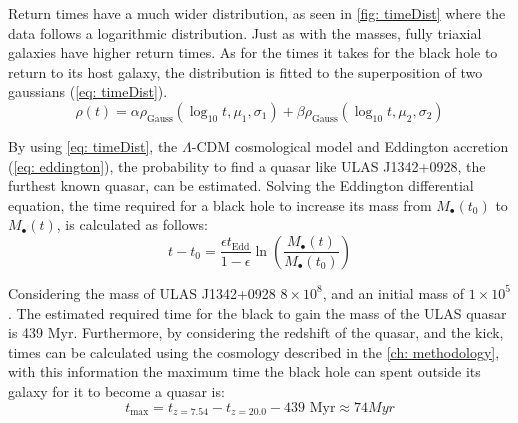 	Return times have a much wider distribution, as seen in \autoref{fig: timeDist} where the data follows a logarithmic distribution. Just as with the masses, fully triaxial galaxies have higher return times. As for the times it takes for the black hole to return to its host galaxy, the distribution is fitted to the superposition of two gaussians (\autoref{eq: timeDist}).
	\begin{equation}\label{eq: timeDist}
		\rho(t) = \alpha\rho_\text{Gauss}(\log_{10}t, \mu_1, \sigma_1) + \beta\rho_\text{Gauss}(\log_{10}t, \mu_2, \sigma_2)
	\end{equation}
	
	By using \autoref{eq: timeDist}, the $\Lambda$-CDM cosmological model and Eddington accretion (\autoref{eq: eddington}), the probability to find a quasar like ULAS J1342+0928, the furthest known quasar, can be estimated. Solving the Eddington differential equation, the time required for a black hole to increase its mass from $M_\bullet(t_0)$ to $M_\bullet(t)$, is calculated as follows:
	\begin{equation}
		t - t_0 = \dfrac{\epsilon t_\text{Edd}}{1 - \epsilon}\ln\left(\dfrac{M_\bullet(t)}{M_\bullet(t_0)}\right)
	\end{equation}
	
	Considering the mass of ULAS J1342+0928 $8\times10^8$, and an initial mass of $1\times10^5$ \sm \cite{banados2018800}. The estimated required time for the black to gain the mass of the ULAS quasar is 439 Myr. Furthermore, by considering the redshift of the quasar, and the kick, times can be calculated using the cosmology described in the \autoref{ch: methodology}, with this information the maximum time the black hole can spent outside its galaxy for it to become a quasar is:
	\begin{equation}
		t_\text{max} = t_{z = 7.54} - t_{z = 20.0} - 439\text{ Myr} \approx 74 Myr
	\end{equation}
	
